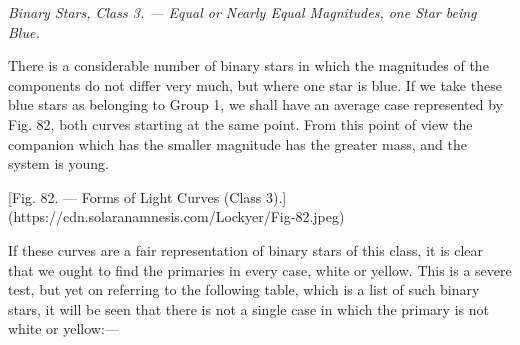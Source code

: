 \documentclass[a4paper, 12pt, oneside, polutonikogreek, english]{article}
\begin{document}
\emph{Binary Stars, Class 3. --- Equal or Nearly Equal Magnitudes, one Star being Blue.}

There is a considerable number of binary stars in which the magnitudes of the components do not differ very much, but where one star is blue. If we take these blue stars as belonging to Group 1, we shall have an average case represented by Fig. 82, both curves starting at the same point. From this point of view the companion which has the smaller magnitude has the greater mass, and the system is young.

[Fig. 82. --- Forms of Light Curves (Class 3).](https://cdn.solaranamnesis.com/Lockyer/Fig-82.jpeg)

If these curves are a fair representation of binary stars of this class, it is clear that we ought to find the primaries in every case, white or yellow. This is a severe test, but yet on referring to the following table, which is a list of such binary stars, it will be seen that there is not a single case in which the primary is not white or yellow:---
\end{document}
